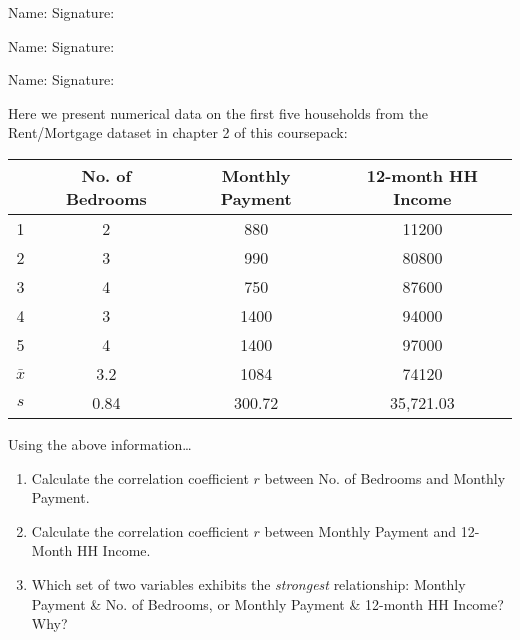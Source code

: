 \documentclass[11pt]{book}\usepackage[]{graphicx}\usepackage[]{color}
\begin{document}
\begin{exercises}
\begin{exercise}
\begin{center}
{{\vspace{4mm}
Name: \underline{\phantom{xxxxxxxxxxxxxxxxxxxxxxxx}} Signature: \underline{\phantom{xxxxxxxxxxxxxxxxxxxxxxxx}}

\vspace{4mm}
Name: \underline{\phantom{xxxxxxxxxxxxxxxxxxxxxxxx}} Signature: \underline{\phantom{xxxxxxxxxxxxxxxxxxxxxxxx}}

\vspace{4mm}
Name: \underline{\phantom{xxxxxxxxxxxxxxxxxxxxxxxx}} Signature: \underline{\phantom{xxxxxxxxxxxxxxxxxxxxxxxx}}
 }}
\end{center}

Here we present numerical data on the first five households from the Rent/Mortgage dataset in chapter 2 of this coursepack:

\begin{center}
\begin{tabular}{@{} cccc @{}} \hline
	& No. of Bedrooms	& Monthly Payment &	12-month HH Income \\ \hline
1 &	2 &	880 &	11200 \\
2 &	3	& 990 &	80800 \\
3 &	4 &	750 &	87600 \\
4 &	3	& 1400 & 94000 \\
5 &	4	& 1400 & 97000 \\ \hline
$\bar{x}$ & 3.2  & 1084   & 74120 \\
$s$       & 0.84 & 300.72 & 35,721.03 \\ \hline
\end{tabular}
\end{center}

Using the above information…

\begin{enumerate}
  \item Calculate the correlation coefficient $r$ between No. of Bedrooms and Monthly Payment.
	\item Calculate the correlation coefficient $r$ between Monthly Payment and 12-Month HH Income.
  \item Which set of two variables exhibits the \textit{strongest} relationship: Monthly Payment \& No. of Bedrooms, or Monthly Payment \& 12-month HH Income? Why?
\end{enumerate}

\end{exercise}
\begin{solution}  %

\end{solution}



\end{exercises}
\end{document}
